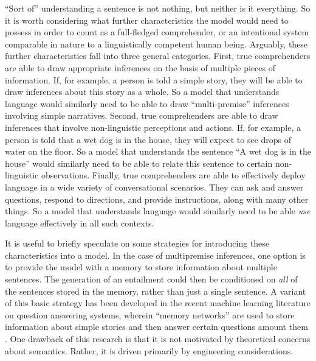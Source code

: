 ``Sort of'' understanding a sentence is not nothing, but neither is it everything. So it is worth considering what further characteristics the model would need to possess in order to count as a full-fledged comprehender, or an intentional system comparable in nature to a linguistically competent human being. Arguably, these further characteristics fall into three general categories. First, true comprehenders are able to draw appropriate inferences on the basis of multiple pieces of information. If, for example, a person is told a simple story, they will be able to draw inferences about this story as a whole. So a model that understands language would similarly need to be able to draw ``multi-premise'' inferences involving simple narratives. Second, true comprehenders are able to draw inferences that involve non-linguistic perceptions and actions. If, for example, a person is told that a wet dog is in the house, they will expect to see drops of water on the floor. So a model that understands the sentence ``A wet dog is in the house'' would similarly need to be able to relate this sentence to certain non-linguistic observations. Finally, true comprehenders are able to effectively deploy language in a wide variety of conversational scenarios. They can ask and answer questions, respond to directions, and provide instructions, along with many other things. So a model that understands language would similarly need to be able \textit{use} language effectively in all such contexts.

It is useful to briefly speculate on some strategies for introducing these characteristics into a model. In the case of multipremise inferences, one option is to provide the model with a memory to store information about multiple sentences. The generation of an entailment could then be conditioned on \textit{all} of the sentences stored in the memory, rather than just a single sentence. A variant of this basic strategy has been developed in the recent machine learning literature on question answering systems, wherein ``memory networks'' are used to store information about simple stories and then answer certain questions amount them \citep{Weston:2016,Weston:2015,Sukhbataar:2015}. One drawback of this research is that it is not motivated by theoretical concerns about semantics. Rather, it is driven primarily by engineering considerations.


